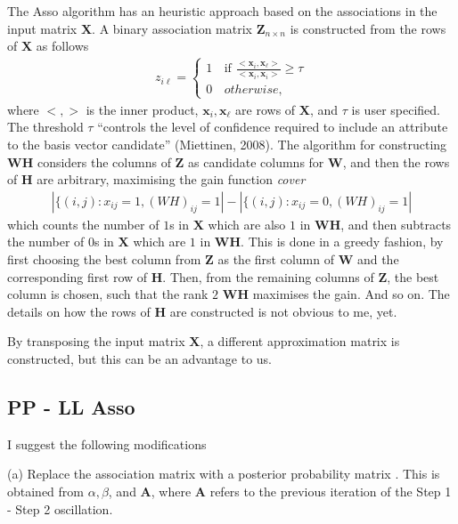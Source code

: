 \documentclass[12pt]{article}
\begin{document}
The Asso algorithm \cite{Miettinen2008Discrete} \cite{Miettinen2014MDL4BMF} has an heuristic approach based on the associations in the input matrix $\mathbf{X}$. 
A binary association matrix $\mathbf{Z}_{n \times n}$ is constructed from the rows of $\mathbf{X}$ as follows
\begin{align} \label{eq:Association}
  z_{i\ell} =
   \begin{cases}
      1 & \text{if } \frac{<\mathbf{x}_i,\mathbf{x}_{\ell}>}{<\mathbf{x}_{i},\mathbf{x}_{i}>} \geq \tau \\
      0 \, &otherwise,
    \end{cases}
\end{align}
where $<,>$ is the inner product, $\mathbf{x}_i,\mathbf{x}_{\ell}$ are rows of $\mathbf{X}$, and $\tau$ is user specified.
The threshold $\tau$ ``controls the level of confidence required to include an attribute to the basis vector candidate'' (Miettinen, 2008). 
The algorithm for constructing $\mathbf{WH}$ considers the columns of $\mathbf{Z}$ as candidate columns for $\mathbf{W}$, and then the rows of $\mathbf{H}$ are arbitrary, maximising the gain function {\it cover}
\begin{align}
   | \{ (i,j) : x_{ij} = 1, (WH)_{ij} = 1| - | \{ (i,j) : x_{ij} = 0, (WH)_{ij} = 1|
\end{align}
which counts the number of $1$s in $\mathbf{X}$ which are also $1$ in $\mathbf{WH}$, and then subtracts the number of $0$s in $\mathbf{X}$ which are $1$ in $\mathbf{WH}$.
This is done in a greedy fashion, by first choosing the best column from $\mathbf{Z}$ as the first column of $\mathbf{W}$ and the corresponding first row of $\mathbf{H}$.
Then, from the remaining columns of  $\mathbf{Z}$, the best column is chosen, such that the rank $2$ $\mathbf{WH}$ maximises the gain. 
And so on.
The details on how the rows  of $\mathbf{H}$ are constructed is not obvious to me, yet. 

By transposing the input matrix $\mathbf{X}$, a different approximation matrix is constructed, but this can be an advantage to us. 

\subsection{PP -  LL Asso} %

I suggest the following modifications 

(a) Replace the association matrix with a posterior probability matrix \cite{Agrawal1993Mining}. This is obtained from $\alpha, \beta$, and $\mathbf{A}$, where $\mathbf{A}$ refers to the previous iteration of the Step 1 - Step 2 oscillation.
\end{document}
